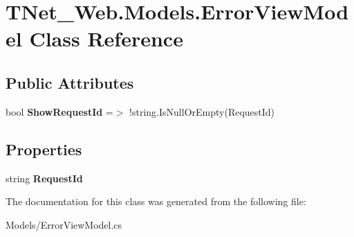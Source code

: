 \hypertarget{class_t_net___web_1_1_models_1_1_error_view_model}{}\section{T\+Net\+\_\+\+Web.\+Models.\+Error\+View\+Model Class Reference}
\label{class_t_net___web_1_1_models_1_1_error_view_model}
\subsection*{Public Attributes}
\begin{DoxyCompactItemize}
\item 
\mbox{\label{class_t_net___web_1_1_models_1_1_error_view_model_a7a7b4df9fe1643f406840b172a0fc2a2}} 
bool {\bfseries Show\+Request\+Id} =$>$ !string.\+Is\+Null\+Or\+Empty(Request\+Id)
\end{DoxyCompactItemize}
\subsection*{Properties}
\begin{DoxyCompactItemize}
\item 
\mbox{\label{class_t_net___web_1_1_models_1_1_error_view_model_a8a6888032c362a630ac62117caeeddaf}} 
string {\bfseries Request\+Id}
\end{DoxyCompactItemize}


The documentation for this class was generated from the following file\+:\begin{DoxyCompactItemize}
\item 
Models/Error\+View\+Model.\+cs\end{DoxyCompactItemize}
